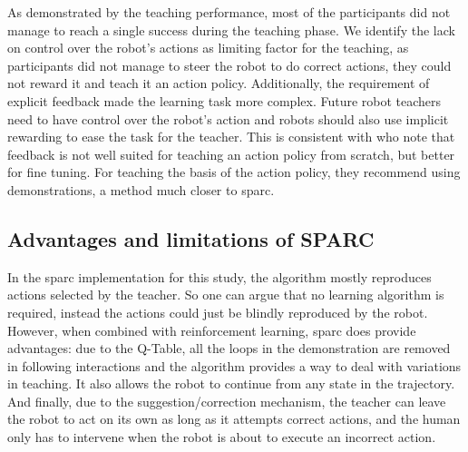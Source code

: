 As demonstrated by the teaching performance, most of the participants did not manage to reach a single success during the teaching phase. We identify the lack on control over the robot's actions as limiting factor for the teaching, as participants did not manage to steer the robot to do correct actions, they could not reward it and teach it an action policy. Additionally, the requirement of explicit feedback made the learning task more complex. Future robot teachers need to have control over the robot's action and robots should also use implicit rewarding to ease the task for the teacher. 
This is consistent with \cite{kaochar2011towards} who note that feedback is not well suited for teaching an action policy from scratch, but better for fine tuning. For teaching the basis of the action policy, they recommend using demonstrations, a method much closer to \gls{sparc}. 

\subsection{Advantages and limitations of SPARC}

In the \gls{sparc} implementation for this study, the algorithm mostly reproduces actions selected by the teacher. So one can argue that no learning algorithm is required, instead the actions could just be blindly reproduced by the robot. However, when combined with reinforcement learning, \gls{sparc} does provide advantages: due to the Q-Table, all the loops in the demonstration are removed in following interactions and the algorithm provides a way to deal with variations in teaching. It also allows the robot to continue from any state in the trajectory. And finally, due to the suggestion/correction mechanism, the teacher can leave the robot to act on its own as long as it attempts correct actions, and the human only has to intervene when the robot is about to execute an incorrect action. 


